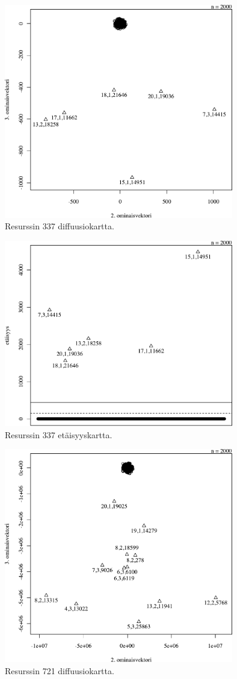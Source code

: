 \begin{figure}[p]
\centering
\includegraphics[width=10cm]{pics/diffuusiokuvat/service_337.pdf}
\caption{Resurssin 337 diffuusiokartta.}
\label{diffusio_337}
\end{figure}

\begin{figure}[p]
\centering
\includegraphics[width=10cm]{pics/tiheyskuvat/service_337.pdf}
\caption{Resurssin 337 etäisyyskartta.}
\label{service_337}
\end{figure}

\begin{figure}[p]
\centering
\includegraphics[width=10cm]{pics/diffuusiokuvat/service_721.pdf}
\caption{Resurssin 721 diffuusiokartta.}
\label{diffusio_721}
\end{figure}

